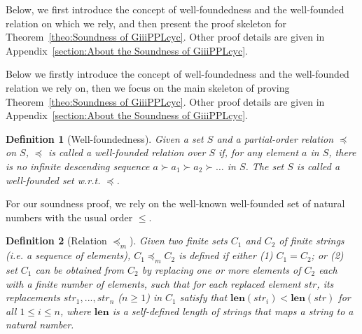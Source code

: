 \documentclass[manuscript,screen]{acmart}
\newtheorem{definition}{Definition}[section]
\newcommand{\cnt}[0]{\mathit{C}}
\newcommand{\mult}[0]{\preceq_m}
\newcommand{\str}[0]{str}
\newcommand{\len}[0]{\textbf{len}}
\begin{document}


\fi

Below, we first introduce the concept of well-foundedness and the well-founded relation on which we rely, and then present the proof skeleton for Theorem~\ref{theo:Soundness of GiiiPPLcyc}. 
Other proof details are given in Appendix~\ref{section:About the Soundness of GiiiPPLcyc}. 

\ifx
Below we firstly introduce the concept of well-foundedness and the well-founded relation we rely on, then we focus on the main skeleton of proving Theorem~\ref{theo:Soundness of GiiiPPLcyc}. 
Other proof details are given in Appendix~\ref{section:About the Soundness of GiiiPPLcyc}. 
\fi

\begin{definition}[Well-foundedness]
Given a set $S$ and a partial-order relation $\preceq$ on $S$, 
$\preceq$ is called a \emph{well-founded relation} over $S$ if, for any element $a$ in $S$, there is no infinite descending sequence $a \succ a_1 \succ a_2 \succ \ldots$ in $S$. 
The set $S$ is called a \emph{well-founded} set w.r.t. $\preceq$. 
\end{definition}

For our soundness proof, we rely on the well-known well-founded set of natural numbers with the usual order $\le$. 


\ifx
\begin{definition}[Relation $\mult$]
\label{def:Relation mult}
Given two finite sets $\cnt_1$ and $\cnt_2$ of finite strings (i.e. a sequence of elements),  
    $\cnt_1\mult \cnt_2$ is defined if
    either (1) $\cnt_1 = \cnt_2$; or (2) set $\cnt_1$ can be obtained from $\cnt_2$ by replacing one or more elements of $\cnt_2$ each with a finite number of elements, such that
    for each replaced element $\str$, its replacements $\str_1,...,\str_n$ ($n\ge 1$) in $\cnt_1$ satisfy that $\len(\str_i) < \len(\str)$ for all $1\le i\le n$,  where $\len$ is a self-defined length of strings that maps a string to a natural number. 
\end{definition}
\end{document}

